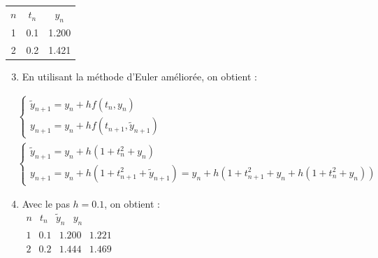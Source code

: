 \documentclass[10pt]{article}
\begin{document}
\begin{center}
\begin{tabular}{ccc}
\(n\) & \(t_{n}\) & \(y_{n}\) \\
1 & 0.1 & 1.200 \\
2 & 0.2 & 1.421 \\
\end{tabular}
\end{center}

\begin{enumerate}
  \setcounter{enumi}{2}
  \item En utilisant la méthode d'Euler améliorée, on obtient :
\end{enumerate}

\[
\begin{aligned}
& \left\{\begin{array}{c}
\tilde{y}_{n+1}=y_{n}+h f\left(t_{n}, y_{n}\right) \\
y_{n+1}=y_{n}+h f\left(t_{n+1}, \tilde{y}_{n+1}\right)
\end{array}\right. \\
& \left\{\begin{array}{l}
\tilde{y}_{n+1}=y_{n}+h\left(1+t_{n}^{2}+y_{n}\right) \\
y_{n+1}=y_{n}+h\left(1+t_{n+1}^{2}+\tilde{y}_{n+1}\right)=y_{n}+h\left(1+t_{n+1}^{2}+y_{n}+h\left(1+t_{n}^{2}+y_{n}\right)\right)
\end{array}\right.
\end{aligned}
\]

\begin{enumerate}
  \setcounter{enumi}{3}
  \item Avec le pas \(h=0.1\), on obtient :\\
\(\begin{array}{llll}n & t_{n} & \tilde{y}_{n} & y_{n}\end{array}\)\\
\(\begin{array}{llll}1 & 0.1 & 1.200 & 1.221\end{array}\)\\
\(\begin{array}{llll}2 & 0.2 & 1.444 & 1.469\end{array}\)
\end{enumerate}
\end{document}
